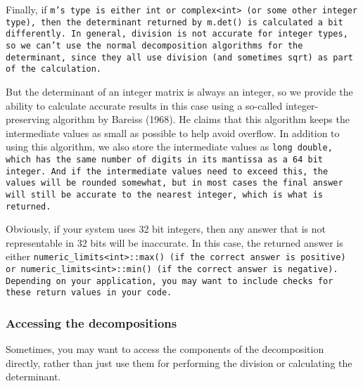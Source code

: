 Finally, if \tt{m}'s type is either \tt{int} or \tt{complex<int>} (or some other integer type),
then the determinant returned by \tt{m.det()} is calculated a bit differently.  In general, division is not accurate
for integer types, so we can't use the normal decomposition algorithms for the determinant,
since they all use division (and sometimes \tt{sqrt}) as part of the calculation.  

But the determinant of an integer matrix
is always an integer, so we provide the ability to calculate accurate results in this case 
using a so-called integer-preserving algorithm by Bareiss (1968).  He claims that this
algorithm keeps the intermediate values as small as possible to help avoid overflow.
In addition to using this algorithm, we also store the intermediate values as \tt{long double},
which has the same number of digits in its mantissa as a 64 bit integer.  And if the intermediate
values need to exceed this, the values will be rounded somewhat, but in most cases the 
final answer will still be accurate to the nearest integer, which is what is returned.

Obviously, if your system uses 32 bit integers, then any answer that is not representable in
32 bits will be inaccurate.  In this case, the returned answer is either \tt{numeric_limits<int>::max()}
(if the correct answer is positive) or \tt{numeric_limits<int>::min()} (if the correct answer is
negative).  Depending on your application, you may want to include checks for these return values
in your code.


\subsubsection{Accessing the decompositions}
\label{Matrix_Division_Access}

Sometimes, you may want to access the components of the decomposition directly,
rather than just use them for performing the division or calculating the determinant.

